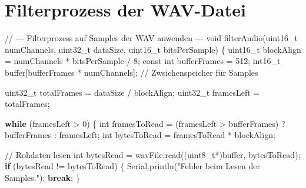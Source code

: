 \documentclass[
  ngerman,
  letterpaper,
  DIV=11]{scrreprt}
\newenvironment{Shaded}{\begin{snugshade}}{\end{snugshade}}
\newcommand{\AttributeTok}[1]{\textcolor[rgb]{0.40,0.45,0.13}{#1}}
\newcommand{\CommentTok}[1]{\textcolor[rgb]{0.37,0.37,0.37}{#1}}
\newcommand{\ControlFlowTok}[1]{\textcolor[rgb]{0.00,0.23,0.31}{\textbf{#1}}}
\newcommand{\DataTypeTok}[1]{\textcolor[rgb]{0.68,0.00,0.00}{#1}}
\newcommand{\DecValTok}[1]{\textcolor[rgb]{0.68,0.00,0.00}{#1}}
\newcommand{\NormalTok}[1]{\textcolor[rgb]{0.00,0.23,0.31}{#1}}
\newcommand{\OperatorTok}[1]{\textcolor[rgb]{0.37,0.37,0.37}{#1}}
\newcommand{\StringTok}[1]{\textcolor[rgb]{0.13,0.47,0.30}{#1}}
\begin{document}
\section{Filterprozess der WAV-Datei}\label{filterprozess-der-wav-datei}

\begin{Shaded}
\begin{Highlighting}[]
\CommentTok{// {-}{-}{-} Filterprozess auf Samples der WAV anwenden {-}{-}{-}}
\DataTypeTok{void}\NormalTok{ filterAudio}\OperatorTok{(}\DataTypeTok{uint16\_t}\NormalTok{ numChannels}\OperatorTok{,} \DataTypeTok{uint32\_t}\NormalTok{ dataSize}\OperatorTok{,} \DataTypeTok{uint16\_t}\NormalTok{ bitsPerSample}\OperatorTok{)} \OperatorTok{\{}
  \DataTypeTok{uint16\_t}\NormalTok{ blockAlign }\OperatorTok{=}\NormalTok{ numChannels }\OperatorTok{*}\NormalTok{ bitsPerSample }\OperatorTok{/} \DecValTok{8}\OperatorTok{;}
  \AttributeTok{const} \DataTypeTok{int}\NormalTok{ bufferFrames }\OperatorTok{=} \DecValTok{512}\OperatorTok{;}
  \DataTypeTok{int16\_t}\NormalTok{ buffer}\OperatorTok{[}\NormalTok{bufferFrames }\OperatorTok{*}\NormalTok{ numChannels}\OperatorTok{];} \CommentTok{// Zwsichenspeicher für Samples}

  \DataTypeTok{uint32\_t}\NormalTok{ totalFrames }\OperatorTok{=}\NormalTok{ dataSize }\OperatorTok{/}\NormalTok{ blockAlign}\OperatorTok{;}
  \DataTypeTok{uint32\_t}\NormalTok{ framesLeft }\OperatorTok{=}\NormalTok{ totalFrames}\OperatorTok{;}

  \ControlFlowTok{while} \OperatorTok{(}\NormalTok{framesLeft }\OperatorTok{\textgreater{}} \DecValTok{0}\OperatorTok{)} \OperatorTok{\{}
    \DataTypeTok{int}\NormalTok{ framesToRead }\OperatorTok{=} \OperatorTok{(}\NormalTok{framesLeft }\OperatorTok{\textgreater{}}\NormalTok{ bufferFrames}\OperatorTok{)} \OperatorTok{?}\NormalTok{ bufferFrames }\OperatorTok{:}\NormalTok{ framesLeft}\OperatorTok{;}
    \DataTypeTok{int}\NormalTok{ bytesToRead }\OperatorTok{=}\NormalTok{ framesToRead }\OperatorTok{*}\NormalTok{ blockAlign}\OperatorTok{;}

    \CommentTok{// Rohdaten lesen}
    \DataTypeTok{int}\NormalTok{ bytesRead }\OperatorTok{=}\NormalTok{ wavFile}\OperatorTok{.}\NormalTok{read}\OperatorTok{((}\DataTypeTok{uint8\_t}\OperatorTok{*)}\NormalTok{buffer}\OperatorTok{,}\NormalTok{ bytesToRead}\OperatorTok{);}
    \ControlFlowTok{if} \OperatorTok{(}\NormalTok{bytesRead }\OperatorTok{!=}\NormalTok{ bytesToRead}\OperatorTok{)} \OperatorTok{\{}
\NormalTok{      Serial}\OperatorTok{.}\NormalTok{println}\OperatorTok{(}\StringTok{"Fehler beim Lesen der Samples."}\OperatorTok{);}
      \ControlFlowTok{break}\OperatorTok{;}
    \OperatorTok{\}}


\end{Highlighting}
\end{Shaded}
\end{document}
